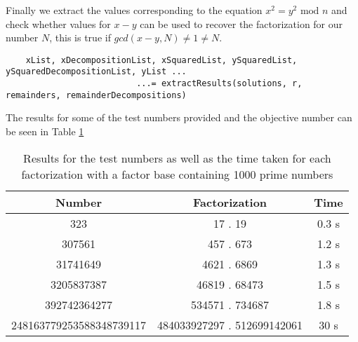 \documentclass{article}
\begin{document}
Finally we extract the values corresponding to the equation $x^2 = y^2 \text{ mod } n$ and check whether values for $x-y$ can be used to recover the factorization for our number $N$, this is true if $gcd(x-y,N) \neq 1 \neq N$.

\begin{verbatim}
    xList, xDecompositionList, xSquaredList, ySquaredList, ySquaredDecompositionList, yList ...
                          ...= extractResults(solutions, r, remainders, remainderDecompositions)
\end{verbatim}



The results for some of the test numbers provided and the objective number can be seen in Table \ref{tab:results}

\begin{table}[h]
    \centering
    \begin{tabular}{|c|c|c|}
    \hline
        \textbf{Number}       & \textbf{Factorization}   & \textbf{Time }      \\ \hline \hline
        323          & 17 . 19         & 0.3 s     \\ \hline
        307561       & 457 . 673       & 1.2 s     \\ \hline
        31741649     & 4621 . 6869     & 1.3 s     \\ \hline
        3205837387   & 46819 . 68473   & 1.5 s     \\ \hline
        392742364277 & 534571 . 734687 & 1.8 s     \\ \hline
        248163779253588348739117 & 484033927297 . 512699142061 & 30 s           \\
    \hline
    \end{tabular}
    \caption{Results for the test numbers as well as the time taken for each factorization with a factor base containing 1000 prime numbers}
    \label{tab:results}
\end{table}
\end{document}
